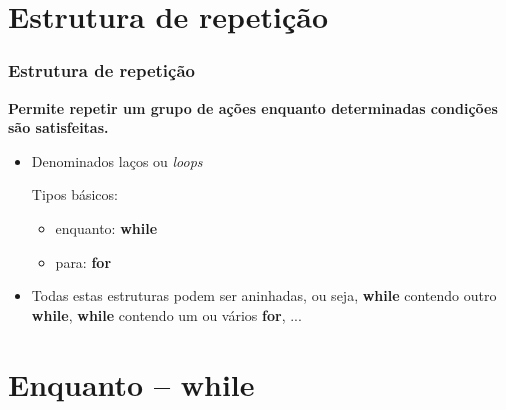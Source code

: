 \documentclass{beamer}
\begin{document}
  

    


\section{Estrutura de repetição}

\begin{frame}[fragile]
\frametitle{Estrutura de repetição}
\small

\vfill \begin{block}{}
 \textbf{Permite repetir um grupo de ações enquanto determinadas condições são satisfeitas.}
\end{block}

\begin{itemize}
 \vfill \item Denominados laços ou \textit{loops}
 \small
 
 \vfill Tipos básicos:
 
 \begin{itemize}
    \small
    \vfill \item enquanto: \textbf{while}
  
    \vfill \item para: \textbf{for}
  
 \end{itemize}
 
 \vfill\item Todas estas estruturas podem ser aninhadas, ou seja, \textbf{while} contendo outro \textbf{while}, \textbf{while} contendo um ou vários \textbf{for}, ...

 
\end{itemize}
\end{frame}



\section{Enquanto -- while}
\end{document}
